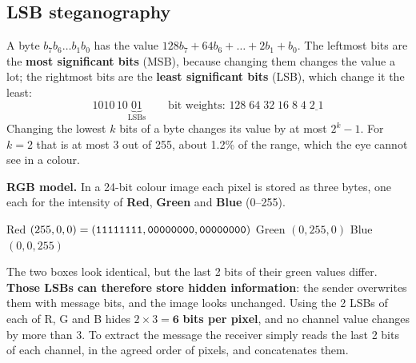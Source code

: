 \subsection{LSB steganography}
A byte $b_7 b_6 \dots b_1 b_0$ has the value $128 b_7 + 64 b_6 + \dots + 2 b_1 + b_0$. The leftmost bits are the \textbf{most significant bits} (MSB), because changing them changes the value a lot; the rightmost bits are the \textbf{least significant bits} (LSB), which change it the least:
\[
1010\,10\underbrace{01}_{\text{LSBs}} \qquad\text{bit weights: } 128\;64\;32\;16\;8\;4\;\underline{2\;1}
\]
Changing the lowest $k$ bits of a byte changes its value by at most $2^k - 1$. For $k = 2$ that is at most 3 out of 255, about 1.2\% of the range, which the eye cannot see in a colour.

\textbf{RGB model.} In a 24-bit colour image each pixel is stored as three bytes, one each for the intensity of \textbf{Red}, \textbf{Green} and \textbf{Blue} (0--255).
\begin{center}\small Red $(255,0,0) = (\texttt{11111111}, \texttt{00000000}, \texttt{00000000})$ \quad Green $(0,255,0)$ \quad Blue $(0,0,255)$\end{center}

\begin{center}
\end{center}
The two boxes look identical, but the last 2 bits of their green values differ. \textbf{Those LSBs can therefore store hidden information}: the sender overwrites them with message bits, and the image looks unchanged. Using the 2 LSBs of each of R, G and B hides $2 \times 3 = \mathbf{6}$ \textbf{bits per pixel}, and no channel value changes by more than 3. To extract the message the receiver simply reads the last 2 bits of each channel, in the agreed order of pixels, and concatenates them.

